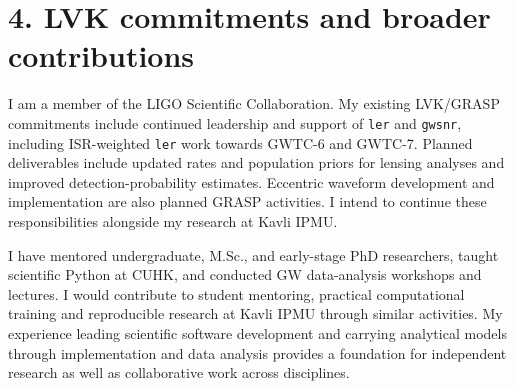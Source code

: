 \documentclass[11pt]{article}
\begin{document}
\section*{4. LVK commitments and broader contributions}
I am a member of the LIGO Scientific Collaboration. My existing LVK/GRASP commitments include continued leadership and support of \texttt{ler} and \texttt{gwsnr}, including ISR-weighted \texttt{ler} work towards GWTC-6 and GWTC-7. Planned deliverables include updated rates and population priors for lensing analyses and improved detection-probability estimates. Eccentric waveform development and implementation are also planned GRASP activities. I intend to continue these responsibilities alongside my research at Kavli IPMU.

I have mentored undergraduate, M.Sc., and early-stage PhD researchers, taught scientific Python at CUHK, and conducted GW data-analysis workshops and lectures. I would contribute to student mentoring, practical computational training and reproducible research at Kavli IPMU through similar activities. My experience leading scientific software development and carrying analytical models through implementation and data analysis provides a foundation for independent research as well as collaborative work across disciplines.

\newpage
\end{document}
